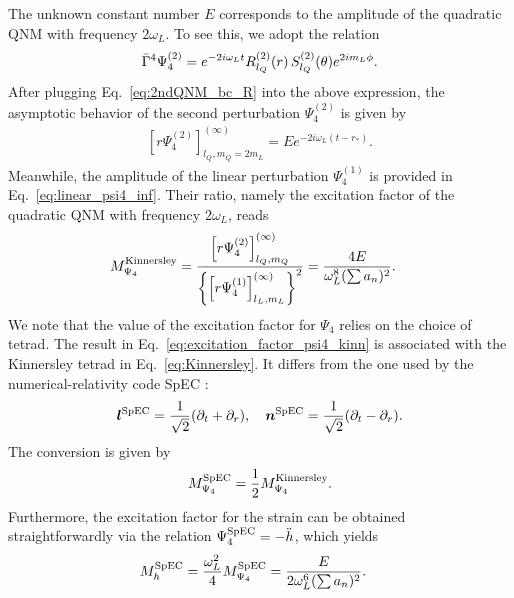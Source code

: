 \documentclass[aps,prd,amsmath,floats,floatfix, twocolumn,
superscriptaddress,nofootinbib,showpacs]{revtex4-1}
\begin{document}
The unknown constant number $E$ corresponds to the amplitude of the quadratic QNM with frequency $2\omega_L$. To see this, we adopt the relation 
\begin{align}
   \bar{\Gamma}^4\Psi_4^{(2)}= e^{-2i\omega_{L} t} R^{(2)}_{l_Q}(r) \, S^{(2)}_{l_Q}(\theta)e^{2im_L \phi}. \notag
\end{align}
After plugging Eq.~\eqref{eq:2ndQNM_bc_R} into the above expression, the asymptotic behavior of the second perturbation $\Psi_4^{(2)}$ is given by
\begin{align}
    \left[r\Psi_4^{(2)}\right]_{l_Q,m_Q=2m_L}^{(\infty)}=E e^{-2i\omega_{L} (t-r_*)}.
\end{align}
Meanwhile, the amplitude of the linear perturbation $\Psi_4^{(1)}$ is provided in Eq.~\eqref{eq:linear_psi4_inf}. Their ratio, namely the excitation factor of the quadratic QNM with frequency $2\omega_L$, reads
\begin{align}
    &M_{\Psi_4}^{\rm Kinnersley} = \frac{\left[r\Psi_4^{(2)}\right]_{l_Q,m_Q}^{(\infty)}}{\left\{\left[r\Psi_4^{(1)}\right]_{l_L,m_L}^{(\infty)}\right\}^2}=\frac{4E}{\omega_{L}^8(\sum a_n)^2}. \label{eq:excitation_factor_psi4_kinn}
\end{align}
We note that the value of the excitation factor for $\Psi_4$  relies on the choice of tetrad. The result in Eq.~\eqref{eq:excitation_factor_psi4_kinn} is associated with the Kinnersley tetrad in Eq.~\eqref{eq:Kinnersley}. It differs from the one used by the numerical-relativity code SpEC \cite{SpECwebsite,Iozzo:2020jcu}:
\begin{align}
    \bm{l}^{\rm SpEC}=\frac{1}{\sqrt{2}}(\partial_t+\partial_r), \quad
    \bm{n}^{\rm SpEC}=\frac{1}{\sqrt{2}}(\partial_t-\partial_r).
\end{align}
The conversion is given by \cite{Zhu:2024rej}
\begin{align}
    M_{\Psi_4}^{\rm SpEC}=\frac{1}{2}M_{\Psi_4}^{\rm Kinnersley}.
\end{align}
Furthermore, the excitation factor for the strain can be obtained straightforwardly via the relation $\Psi_4^{\rm SpEC}=-\ddot{h}$, which yields
\begin{align}
    &M_{h}^{\rm SpEC}=\frac{\omega_L^2}{4}M_{\Psi_4}^{\rm SpEC} =\frac{E}{2\omega_{L}^6(\sum a_n)^2}. \label{eq:excitation_factor_h_spec}
\end{align}
\end{document}
